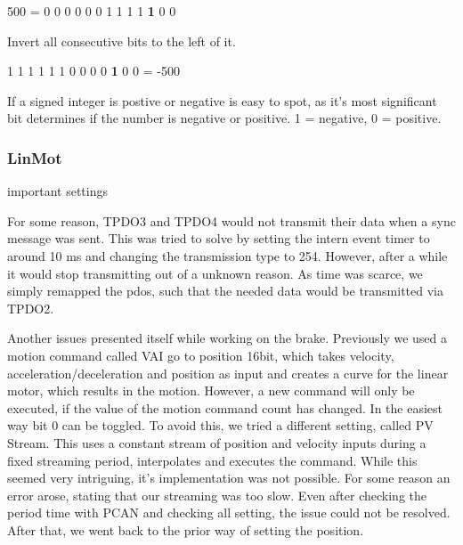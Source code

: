 500 = 0 0 0 0  0 0 1  1 1 1  \textbf{1} 0 0

Invert all consecutive bits to the left of it.

1 1 1 1  1 1 0  0 0 0  \textbf{1} 0 0 = -500

If a signed integer is postive or negative is easy to spot, as it's most significant bit determines if the number is negative or positive. 1 = negative, 0 = positive.

\subsubsection{LinMot}
important settings

For some reason, TPDO3 and TPDO4 would not transmit their data when a sync message was sent. This was tried to solve by setting the intern event timer to around 10 ms and changing the transmission type to 254. However, after a while it would stop transmitting out of a unknown reason. As time was scarce, we simply remapped the pdos, such that the needed data would be transmitted via TPDO2. 


Another issues presented itself while working on the brake. Previously we used a motion command called VAI go to position 16bit, which takes velocity, acceleration/deceleration and position as input and creates a curve for the linear motor, which results in the motion. However, a new command will only be executed, if the value of the motion command count has changed. In the easiest way bit 0 can be toggled. 
To avoid this, we tried a different setting, called PV Stream. This uses a constant stream of position and velocity inputs during a fixed streaming period, interpolates and executes the command. While this seemed very intriguing, it's implementation was not possible. For some reason an error arose, stating that our streaming was too slow. Even after checking the period time with PCAN and checking all setting, the issue could not be resolved.
After that, we went back to the prior way of setting the position.
